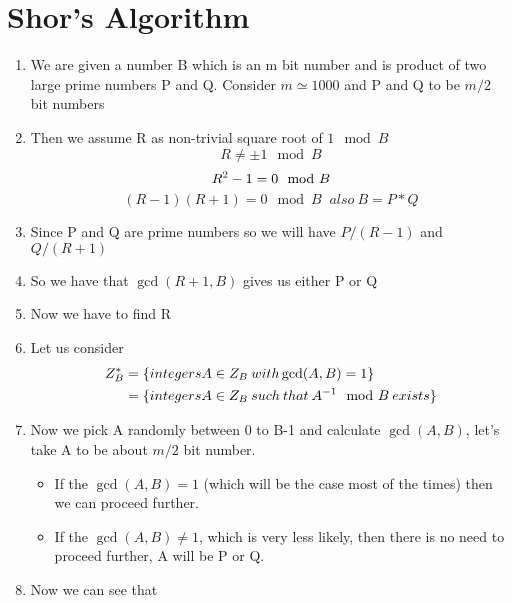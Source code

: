 \section{Shor's Algorithm}
\begin{enumerate}
    \item We are given a number B which is an m bit number and is product of two large prime numbers P and Q. Consider $m \simeq 1000$ and P and Q to be $m/2$ bit numbers
    \item Then we assume R as non-trivial square root of $1\mod B$
    \begin{equation*}
        R \neq \pm 1 \mod B
    \end{equation*}
    \begin{equation*}
        R^2 - 1 = 0 \mod B \notag \\
    \end{equation*}
    \begin{equation*}
         (R-1)(R+1) = 0\mod B \;\; also \: B = P * Q
    \end{equation*}
    \item Since P and Q are prime numbers so we will have $P/(R-1)$ and $Q/(R+1)$
    \item So we have that $\gcd(R+1, B)$ gives us either P or Q
    \item Now we have to find R
    \item Let us consider 
    \begin{equation*}
        \begin{split}
            Z_B^* &=  \{integers A \in Z_B \:with \gcd(A,B) = 1\} \notag \\
            &= \{integers A \in Z_B \:such\: that \:A^{-1}\mod B \:exists\}
        \end{split}
    \end{equation*}
    \item Now we pick A randomly between 0 to B-1 and calculate $\gcd(A,B)$, let's take A to be about $m/2$ bit number.
    \begin{itemize}
        \item If the $\gcd(A,B) = 1$ (which will be the case most of the times) then we can proceed further.
        \item If the $\gcd(A,B) \neq 1$, which is very less likely, then there is no need to proceed further, A will be P or Q.
    \end{itemize}
    \item Now we can see that
    \begin{equation*}

\end{equation*}
\end{enumerate}
